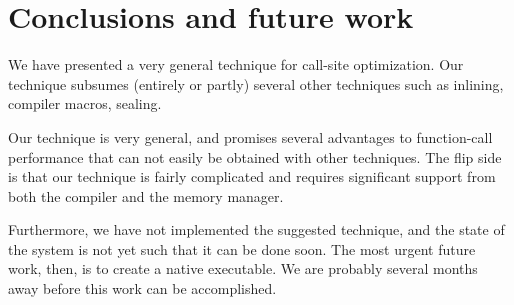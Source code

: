 \section{Conclusions and future work}

We have presented a very general technique for call-site
optimization.  Our technique subsumes (entirely or partly) several
other techniques such as inlining, compiler macros, sealing.

Our technique is very general, and promises several advantages to
function-call performance that can not easily be obtained with other
techniques.  The flip side is that our technique is fairly complicated
and requires significant support from both the compiler and the memory
manager.

Furthermore, we have not implemented the suggested technique, and the
state of the \sicl{} system is not yet such that it can be done soon.
The most urgent future work, then, is to create a native \sicl{}
executable.  We are probably several months away before this work can
be accomplished.
